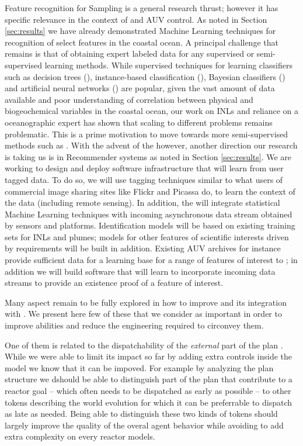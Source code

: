 Feature recognition for Sampling is a general research thrust; however
it has specific relevance in the context of \rx and AUV control. As
noted in Section \ref{sec:results} we have already demonstrated
Machine Learning techniques for recognition of select features in the
coastal ocean. A principal challenge that remains is that of obtaining
expert labeled data for any supervised or semi-supervised learning
methods.  While supervised techniques for learning classifiers such as
decision trees (\cite{Quinlan93-dtrees}), instance-based
classification (\cite{Aha-ibl-ml91}), Bayesian classifiers
(\cite{Jensen2001-BNetworks}) and artificial neural networks
(\cite{ANNsurvey-2000}) are popular, given the vast amount of data
available and poor understanding of correlation between physical and
biogeochemical variables in the coastal ocean, our work on INLs
\cite{mcgann08d,ryan10} and reliance on a oceanographic expert has
shown that scaling to different problems remains problematic. This is
a prime motivation to move towards more semi-supervised methods such
as \cite{kumar11,sergio12}. With the advent of the \od however,
another direction our research is taking us is in Recommender systems
\cite{Adomavicius05} as noted in Section \ref{sec:results}. We are
working to design and deploy software infrastructure that will learn
from user tagged data. To do so, we will use tagging techniques
similar to what users of commercial image sharing sites like Flickr
and Picassa do, to learn the context of the data (including remote
sensing). In addition, the \od will integrate statistical Machine
Learning techniques with incoming asynchronous data stream obtained by
sensors and platforms. Identification models will be based on existing
training sets for INLs and plumes; models for other features of
scientific interests driven by \can requirements will be built in
addition. Existing AUV archives for instance provide sufficient data
for a learning base for a range of features of interest to \can; in
addition we will build software that will learn to incorporate
incoming data streams to provide an existence proof of a feature of
interest. 

Many aspect remain to be fully explored in how to improve \rx and its
integration with \eu. We present here  few of these that we consider
as important in order to improve \rx abilities and reduce the
engineering required to circonvey them.

One of them is related to the dispatchability of
the {\em external} part of the plan \cite{mus98a}. While we were able
to limit its impact so far by adding extra controls inside the \eu
model we know that it can be impoved. For example by analyzing the
plan structure we dshould be able to distinguish part of the plan that
contribute to a  reactor goal -- which often needs to be dispatched
as early as possible -- to other tokens describing the world evolution
for which it can be preferrable to dispatch as late as needed. Being
able to distinguish these two kinds of tokens should largely improve
the quality of the overal agent behavior while avoiding to add extra
complexity on every reactor models. 

